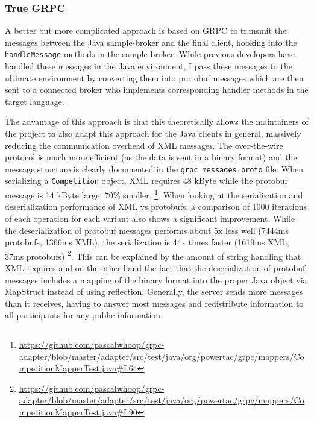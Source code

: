 \subsubsection{True GRPC}%
\label{sub:grpc_based_communication}

A better but more complicated approach is based on \ac{GRPC} to transmit the messages between the Java sample-broker and
the final client, hooking into the \texttt{handleMessage} methods in the sample broker.
While previous developers have handled these messages in the Java environment, I
pass these messages to the ultimate environment by converting them into protobuf messages which are then sent to a
connected broker who implements corresponding handler methods in the target language.

The advantage of this approach is
that this theoretically allows the maintainers of the project to also adapt this approach for the Java clients in
general, massively reducing the communication overhead of \ac{XML} messages. The over-the-wire protocol is much more
efficient (as the data is sent in a binary format) and the message structure is clearly documented in the
\texttt{grpc\_messages.proto} file. When serializing a \texttt{Competition} object, \ac{XML} requires 48 kByte while
the protobuf message is 14 kByte large, 70\% smaller.
\footnote{\url{https://github.com/pascalwhoop/grpc-adapter/blob/master/adapter/src/test/java/org/powertac/grpc/mappers/CompetitionMapperTest.java#L64}}.
When looking at the serialization and deserialization performance of \ac{XML} vs protobufs, a comparison of 1000
iterations of each operation for each variant also shows a significant improvement. While the deserialization of
protobuf messages performs about 5x less well (7444ms protobufs, 1366ms \ac{XML}), the serialization is 44x times
faster (1619ms \ac{XML}, 37ms protobufs)
\footnote{\url{https://github.com/pascalwhoop/grpc-adapter/blob/master/adapter/src/test/java/org/powertac/grpc/mappers/CompetitionMapperTest.java#L90}}.
This can be explained by the amount of string handling that \ac{XML} requires and on the other hand the fact that the
deserialization of protobuf messages includes a mapping of the binary format into the proper Java object via MapStruct instead
of using reflection. Generally, the server sends more messages than it receives, having to answer most messages and
redistribute information to all participants for any public information.



